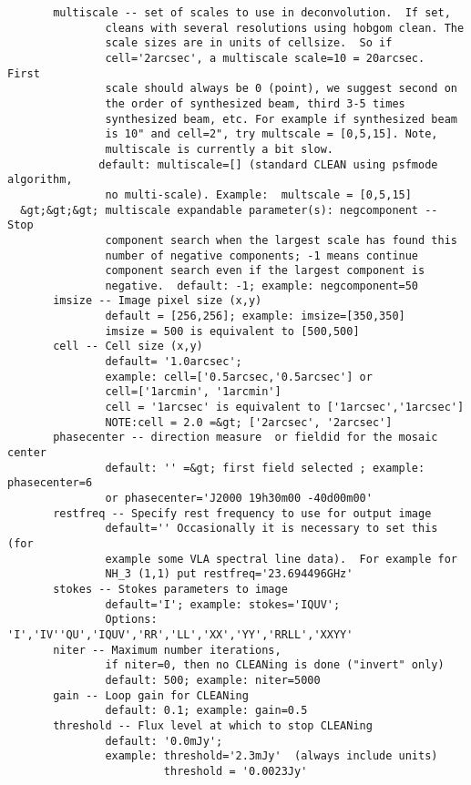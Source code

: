 \begin{verbatim}
       multiscale -- set of scales to use in deconvolution.  If set,
               cleans with several resolutions using hobgom clean. The
               scale sizes are in units of cellsize.  So if
               cell='2arcsec', a multiscale scale=10 = 20arcsec.  First
               scale should always be 0 (point), we suggest second on
               the order of synthesized beam, third 3-5 times
               synthesized beam, etc. For example if synthesized beam
               is 10" and cell=2", try multscale = [0,5,15]. Note,
               multiscale is currently a bit slow.
              default: multiscale=[] (standard CLEAN using psfmode algorithm,
               no multi-scale). Example:  multscale = [0,5,15] 
  &gt;&gt;&gt; multiscale expandable parameter(s): negcomponent -- Stop
               component search when the largest scale has found this
               number of negative components; -1 means continue
               component search even if the largest component is
               negative.  default: -1; example: negcomponent=50
       imsize -- Image pixel size (x,y)
               default = [256,256]; example: imsize=[350,350]
               imsize = 500 is equivalent to [500,500]
       cell -- Cell size (x,y)
               default= '1.0arcsec';
               example: cell=['0.5arcsec,'0.5arcsec'] or
               cell=['1arcmin', '1arcmin']
               cell = '1arcsec' is equivalent to ['1arcsec','1arcsec']
               NOTE:cell = 2.0 =&gt; ['2arcsec', '2arcsec']
       phasecenter -- direction measure  or fieldid for the mosaic center
               default: '' =&gt; first field selected ; example: phasecenter=6
               or phasecenter='J2000 19h30m00 -40d00m00'
       restfreq -- Specify rest frequency to use for output image
               default='' Occasionally it is necessary to set this (for
               example some VLA spectral line data).  For example for
               NH_3 (1,1) put restfreq='23.694496GHz'
       stokes -- Stokes parameters to image
               default='I'; example: stokes='IQUV';
               Options: 'I','IV''QU','IQUV','RR','LL','XX','YY','RRLL','XXYY'
       niter -- Maximum number iterations,
               if niter=0, then no CLEANing is done ("invert" only)
               default: 500; example: niter=5000
       gain -- Loop gain for CLEANing
               default: 0.1; example: gain=0.5
       threshold -- Flux level at which to stop CLEANing
               default: '0.0mJy'; 
               example: threshold='2.3mJy'  (always include units)
                        threshold = '0.0023Jy'

\end{verbatim}
